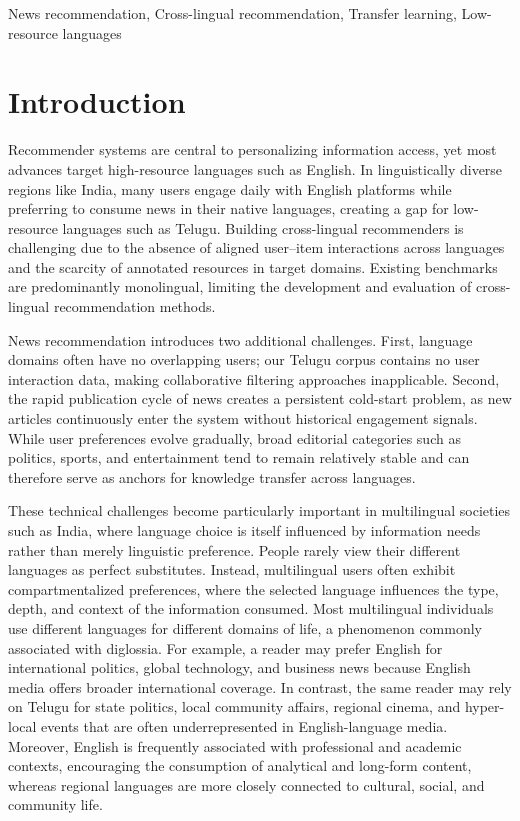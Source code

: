 \documentclass[conference]{IEEEtran}
\begin{document}
\begin{IEEEkeywords}
News recommendation, Cross-lingual recommendation,
Transfer learning, Low-resource languages\end{IEEEkeywords}

\section{Introduction}

Recommender systems are central to personalizing information access, yet most advances target high-resource languages such as English. In linguistically diverse regions like India, many users engage daily with English platforms while preferring to consume news in their native languages, creating a gap for low-resource languages such as Telugu. Building cross-lingual recommenders is challenging due to the absence of aligned user--item interactions across languages and the scarcity of annotated resources in target domains. Existing benchmarks are predominantly monolingual, limiting the development and evaluation of cross-lingual recommendation methods.

News recommendation introduces two additional challenges. First, language domains often have no overlapping users; our Telugu corpus contains no user interaction data, making collaborative filtering approaches inapplicable. Second, the rapid publication cycle of news creates a persistent cold-start problem, as new articles continuously enter the system without historical engagement signals. While user preferences evolve gradually, broad editorial categories such as politics, sports, and entertainment tend to remain relatively stable and can therefore serve as anchors for knowledge transfer across languages.

These technical challenges become particularly important in multilingual societies such as India, where language choice is itself influenced by information needs rather than merely linguistic preference. People rarely view their different languages as perfect substitutes. Instead, multilingual users often exhibit compartmentalized preferences, where the selected language influences the type, depth, and context of the information consumed. Most multilingual individuals use different languages for different domains of life, a phenomenon commonly associated with diglossia. For example, a reader may prefer English for international politics, global technology, and business news because English media offers broader international coverage. In contrast, the same reader may rely on Telugu for state politics, local community affairs, regional cinema, and hyper-local events that are often underrepresented in English-language media. Moreover, English is frequently associated with professional and academic contexts, encouraging the consumption of analytical and long-form content, whereas regional languages are more closely connected to cultural, social, and community life.
\end{document}

